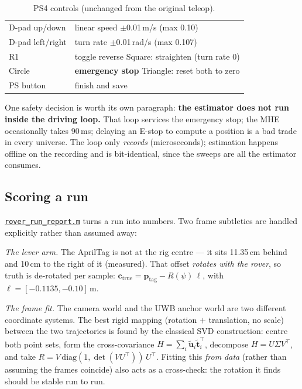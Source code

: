 \documentclass[11pt,a4paper]{article}
\newcommand{\gh}[2]{\href{https://github.com/AdershM-2/UWB_3/blob/main/#1}{\texttt{#2}}}
\begin{document}
\begin{table}[h]
\centering
\caption{PS4 controls (unchanged from the original teleop).}
\small
\begin{tabular}{@{}ll@{}}
\toprule
D-pad up/down & linear speed $\pm$0.01\,m/s (max 0.10)\\
D-pad left/right & turn rate $\pm$0.01\,rad/s (max 0.107)\\
R1 & toggle reverse \qquad Square: straighten (turn rate 0)\\
Circle & \textbf{emergency stop} \qquad Triangle: reset both to zero\\
PS button & finish and save\\
\bottomrule
\end{tabular}
\end{table}

One safety decision is worth its own paragraph: \textbf{the estimator does not run
inside the driving loop.} That loop services the emergency stop; the MHE
occasionally takes 90\,ms; delaying an E-stop to compute a position is a bad trade
in every universe. The loop only \emph{records} (microseconds); estimation happens
offline on the recording and is bit-identical, since the sweeps are all the
estimator consumes.

\subsection{Scoring a run}

\gh{matlab/scripts/rover\_run\_report.m}{rover\_run\_report.m} turns a run into
numbers. Two frame subtleties are handled explicitly rather than assumed away:

\emph{The lever arm.} The AprilTag is not at the rig centre --- it sits 11.35\,cm
behind and 10\,cm to the right of it (measured). That offset \emph{rotates with
the rover}, so truth is de-rotated per sample:
$\mathbf{c}_{\text{true}} = \mathbf{p}_{\text{tag}} -
R(\psi)\,\boldsymbol{\ell}$, with $\boldsymbol{\ell} = [-0.1135, -0.10]$\,m.

\emph{The frame fit.} The camera world and the UWB anchor world are two different
coordinate systems. The best rigid mapping (rotation $+$ translation, no scale)
between the two trajectories is found by the classical SVD construction: centre
both point sets, form the cross-covariance $H = \sum_i \tilde{\mathbf{u}}_i
\tilde{\mathbf{t}}_i^\top$, decompose $H = U\Sigma V^\top$, and take
$R = V\,\mathrm{diag}(1, \det(VU^\top))\,U^\top$. Fitting this \emph{from data}
(rather than assuming the frames coincide) also acts as a cross-check: the
rotation it finds should be stable run to run.
\end{document}
